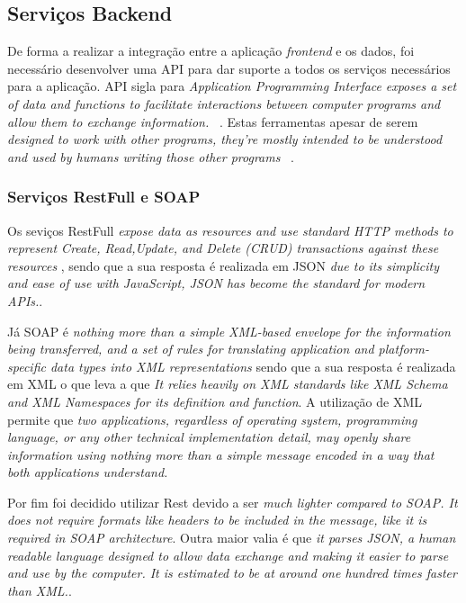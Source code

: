 \subsection{Serviços Backend}

De forma a realizar a integração entre a aplicação \emph{frontend} e os dados, foi necessário desenvolver uma API para dar suporte a todos os serviços necessários para a aplicação.
API sigla para \emph{Application Programming Interface} \emph{exposes a set of data and functions to facilitate interactions between computer programs and allow them to exchange information.} ~\citep{rest_cookbook}.
Estas ferramentas apesar de serem \emph{designed  to  work  with  other  programs,  they’re  mostly intended to be understood and used by humans writing those other programs} ~\citep{api_design}.

\subsubsection{Serviços RestFull e SOAP}
Os seviços RestFull \emph{expose data as resources  and  use  standard  HTTP  methods  to  represent  Create,  Read,Update,  and  Delete  (CRUD)  transactions  against  these  resources}
\citep{api_design}, sendo que a sua resposta é realizada em JSON \emph{due  to  its  simplicity  and  ease  of  use  with  JavaScript,  JSON  has become the standard for modern APIs.}\citep{api_design}.

Já SOAP é \emph{nothing  more  than  a  simple  XML-based  envelope  for  the  information  being  transferred,  and  a  set  of  rules  for  translating  application and platform-specific data types into XML representations}\citep{Snell2002} sendo que a sua resposta é realizada em XML o que leva a que \emph{It relies heavily on XML  standards  like  XML  Schema  and  XML  Namespaces  for  its  definition  and  function}\citep{Snell2002}. A utilização de XML permite que \emph{two  applications,  regardless  of  operating  system,  programming  language,  or  any  other  technical  implementation  detail,  may  openly  share  information  using  nothing  more  than  a  simple  message  encoded  in  a  way  that  both  applications  understand.}\citep{Snell2002}

Por fim foi decidido utilizar Rest devido a ser \emph{much lighter compared to SOAP. It does not require formats like headers to be included in the message, like it is required in SOAP architecture}. Outra maior valia é que \emph{ it parses JSON, a human readable language designed to allow data exchange and making it easier to parse and use by the computer. It is estimated to be at around one hundred times faster than XML.}\citep{Halili2018}.

